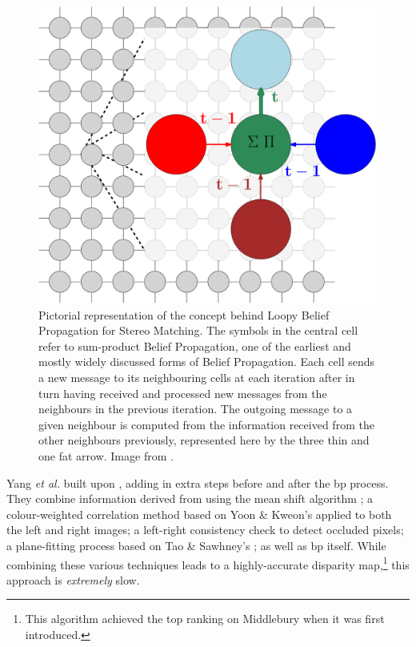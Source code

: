 \begin{figure}
    \centering
    \includegraphics[width=1.0\textwidth]{chapters/litreview/images/bp_diagram-eps-converted-to.pdf}
    \caption{Pictorial representation of the concept behind Loopy Belief Propagation for Stereo Matching. The symbols in the central cell refer to sum-product Belief Propagation, one of the earliest and mostly widely discussed forms of Belief Propagation. Each cell sends a new message to its neighbouring cells at each iteration after in turn having received and processed new messages from the neighbours in the previous iteration. The outgoing message to a given neighbour is computed from the information received from the other neighbours previously, represented here by the three thin and one fat arrow.  Image from \cite{lbpmpsmpic}.}
    \label{fig:bpdiagram}
\end{figure}

Yang \textit{et al.} \cite{Yang2006a} built upon , adding in extra steps before and after the \gls{bp} process.  They combine information derived from using the mean shift algorithm \cite{Comaniciu2002}; a colour-weighted correlation method based on Yoon \& Kweon's \cite{Yoon2006} applied to both the left and right images; a left-right consistency check to detect occluded pixels; a plane-fitting process based on Tao \& Sawhney's \cite{Tao2000}; as well as \gls{bp} itself.  While combining these various techniques leads to a highly-accurate disparity map,\footnote{This algorithm achieved the top ranking on Middlebury when it was first introduced.} this approach is \emph{extremely} slow.

